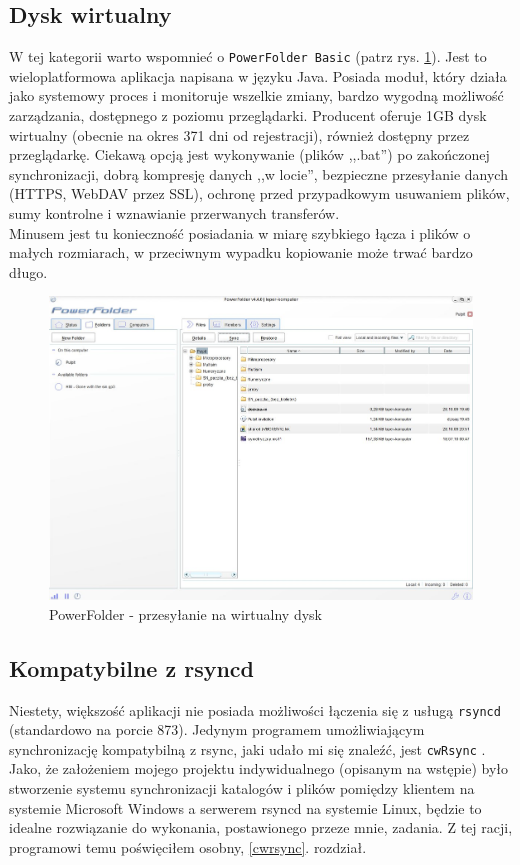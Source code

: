 \subsection{Dysk wirtualny}
W tej kategorii warto wspomnieć o \verb|PowerFolder Basic| \cite{3} (patrz rys. \ref{power}). Jest to wieloplatformowa aplikacja napisana w języku Java. Posiada moduł, który działa jako systemowy proces i monitoruje wszelkie zmiany, bardzo wygodną możliwość zarządzania, dostępnego z poziomu przeglądarki. Producent oferuje 1GB dysk wirtualny (obecnie na okres 371 dni od rejestracji), również dostępny przez przeglądarkę. Ciekawą opcją jest wykonywanie (plików ,,.bat'') po zakończonej synchronizacji, dobrą kompresję danych ,,w locie'', bezpieczne przesyłanie danych (HTTPS, WebDAV przez SSL), ochronę przed przypadkowym usuwaniem plików, sumy kontrolne i wznawianie przerwanych transferów.\\
Minusem jest tu konieczność posiadania w miarę szybkiego łącza i plików o małych rozmiarach, w przeciwnym wypadku kopiowanie może trwać bardzo długo.
\begin{figure}[h!]
	\centering
	\includegraphics[width=1\textwidth]{img/s5.jpeg}
	\caption{PowerFolder - przesyłanie na wirtualny dysk}
	\label{power}
\end{figure}
\subsection{Kompatybilne z rsyncd}
Niestety, większość aplikacji nie posiada możliwości łączenia się z usługą \verb|rsyncd| (standardowo na porcie 873). Jedynym programem umożliwiającym synchronizację kompatybilną z rsync, jaki udało mi się znaleźć, jest 
\verb|cwRsync| \cite{4}. Jako, że założeniem mojego projektu indywidualnego (opisanym na wstępie) było stworzenie systemu synchronizacji katalogów i plików pomiędzy klientem na systemie Microsoft Windows a serwerem rsyncd na systemie Linux, będzie to idealne rozwiązanie do wykonania, postawionego przeze mnie, zadania. Z tej racji, programowi temu poświęciłem osobny, \ref{cwrsync}. rozdział.

